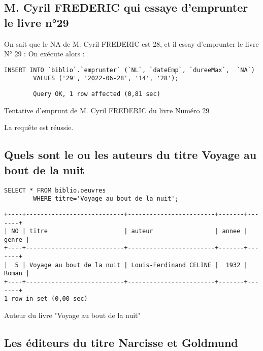 \documentclass{article}
\begin{document}
\subsection{M. Cyril FREDERIC qui essaye d’emprunter le livre n°29}
On sait que le NA de M. Cyril FREDERIC est 28, et il  essay d'emprunter le livre N° 29 :
On exécute alors :
\begin{listing}[H]
	\begin{verbatim}
INSERT INTO `biblio`.`emprunter` (`NL`, `dateEmp`, `dureeMax`,  `NA`) 
		VALUES ('29', '2022-06-28', '14', '28');
\end{verbatim}
	\begin{verbatim}
		Query OK, 1 row affected (0,81 sec)
\end{verbatim}
	\caption{Tentative d'emprunt de M. Cyril FREDERIC du livre Numéro 29}
\end{listing}
La requête est réussie.

\subsection{Quels sont le ou les auteurs du titre \og Voyage au bout de la nuit \fg}
\begin{center}
	\begin{minipage}{0.8\linewidth}
\begin{listing}[H]
	\begin{verbatim}
SELECT * FROM biblio.oeuvres
		WHERE titre='Voyage au bout de la nuit';
\end{verbatim}
	\begin{verbatim}
+----+---------------------------+------------------------+-------+-------+
| NO | titre                     | auteur                 | annee | genre |
+----+---------------------------+------------------------+-------+-------+
|  5 | Voyage au bout de la nuit | Louis-Ferdinand CELINE |  1932 | Roman |
+----+---------------------------+------------------------+-------+-------+
1 row in set (0,00 sec)
\end{verbatim}
	\caption{Auteur du livre "Voyage au bout de la nuit"}
\end{listing}			
	\end{minipage}
\end{center}


\subsection{Les éditeurs du titre \og Narcisse et Goldmund \fg}
\end{document}
